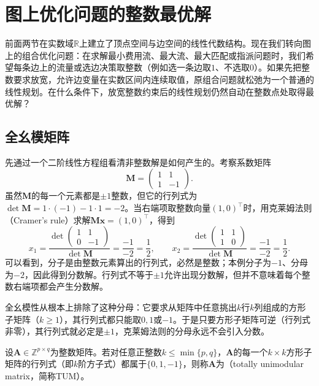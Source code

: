 \section{图上优化问题的整数最优解}
\label{sec:graph-incidence-total-unimodularity}
\label{sec:incidence-tu-definition}
\label{sec:incidence-integral-optima}
\label{sec:incidence-lp-models}
\label{sec:incidence-integral-vertex-theorem}

前面两节在实数域$\mathbb{R}$上建立了顶点空间与边空间的线性代数结构。现在我们转向图上的组合优化问题：在求解最小费用流、最大流、最大匹配或指派问题时，我们希望每条边上的流量或选边决策取整数（例如选一条边取$1$、不选取$0$）。如果先把整数要求放宽，允许边变量在实数区间内连续取值，原组合问题就松弛为一个普通的线性规划。在什么条件下，放宽整数约束后的线性规划仍然自动在整数点处取得最优解？

\subsection{全幺模矩阵}
\label{sec:incidence-tu-matrix}

先通过一个二阶线性方程组看清非整数解是如何产生的。考察系数矩阵
\[
\bm{M}=\begin{pmatrix}1&1\\1&-1\end{pmatrix}.
\]
虽然$\bm{M}$的每一个元素都是$\pm1$整数，但它的行列式为$\det\bm{M}=1\cdot(-1)-1\cdot1=-2$。当右端项取整数向量$(1,0)^\top$时，用克莱姆法则（Cramer's rule）求解$\bm{M}\bm{x}=(1,0)^\top$，得到
\[
x_1=\frac{\det\begin{pmatrix}1&1\\0&-1\end{pmatrix}}{\det\bm{M}}=\frac{-1}{-2}=\frac{1}{2},\qquad
x_2=\frac{\det\begin{pmatrix}1&1\\1&0\end{pmatrix}}{\det\bm{M}}=\frac{-1}{-2}=\frac{1}{2}.
\]
可以看到，分子是由整数元素算出的行列式，必然是整数；本例分子为$-1$、分母为$-2$，因此得到分数解。行列式不等于$\pm1$允许出现分数解，但并不意味着每个整数右端项都会产生分数解。

全幺模性从根本上排除了这种分母：它要求从矩阵中任意挑出$k$行$k$列组成的方形子矩阵（$k\geq 1$），其行列式都只能取$0,1$或$-1$。于是只要方形子矩阵可逆（行列式非零），其行列式就必定是$\pm1$，克莱姆法则的分母永远不会引入分数。

\begin{definition}[全幺模矩阵]
\label{def:graph-total-unimodularity}
设$\bm{A}\in\mathbb{Z}^{p\times q}$为整数矩阵。若对任意正整数$k\leq\min\{p,q\}$，$\bm{A}$的每一个$k\times k$方形子矩阵的行列式（即$k$阶方子式）都属于$\{0,1,-1\}$，则称$\bm{A}$为（totally unimodular matrix，简称TUM）。
\end{definition}

